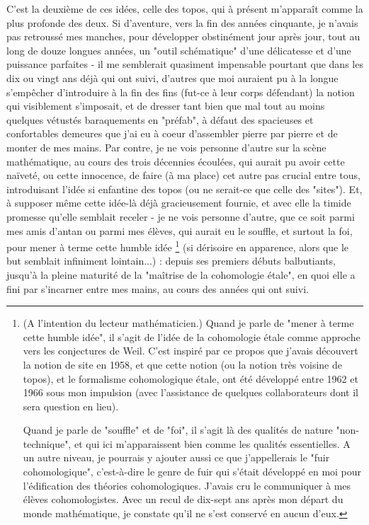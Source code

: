 C'est la deuxième de ces idées, celle des topos, qui à présent m'apparaît comme la plus profonde des deux. Si d'aventure, vers la fin des années cinquante, je n'avais pas retroussé mes manches, pour développer obstinément jour après jour, tout au long de douze longues années, un "outil schématique" d'une délicatesse et d'une puissance parfaites - il me semblerait quasiment impensable pourtant que dans les dix ou vingt ans déjà qui ont suivi, d'autres que moi auraient pu à la longue s'empêcher d'introduire à la fin des fins (fut-ce à leur corps défendant) la notion qui visiblement s'imposait, et de dresser tant bien que mal tout au moins quelques vétustés baraquements en "préfab", à défaut des spacieuses et confortables demeures que j’ai eu à coeur d'assembler pierre par pierre et de monter de mes mains. Par contre, je ne vois personne d'autre sur la scène mathématique, au cours des trois décennies écoulées, qui aurait pu avoir cette naïveté, ou cette innocence, de faire (à ma place) cet autre pas crucial entre tous, introduisant l'idée si enfantine des topos (ou ne serait-ce que celle des "sites"). Et, à supposer même cette idée-là déjà gracieusement fournie, et avec elle la timide promesse qu'elle semblait receler - je ne vois personne d'autre, que ce soit parmi mes amis d'antan ou parmi mes élèves, qui aurait eu le souffle, et surtout la foi, pour mener à terme cette humble idée \footnote{(A l’intention du lecteur mathématicien.) Quand je parle de "mener à terme cette humble idée", il s'agit de l'idée de la cohomologie étale comme approche vers les conjectures de Weil. C'est inspiré par ce propos que j'avais découvert la notion de site en 1958, et que cette notion (ou la notion très voisine de topos), et le formalisme cohomologique étale, ont été développé entre 1962 et 1966 sous mon impulsion (avec l'assistance de quelques collaborateurs dont il sera question en lieu).

Quand je parle de "souffle" et de "foi", il s'agit là des qualités de nature "non-technique", et qui ici m'apparaissent bien comme les qualités essentielles. A un autre niveau, je pourrais y ajouter aussi ce que j'appellerais le "fuir cohomologique", c'est-à-dire le genre de fuir qui s'était développé en moi pour l'édification des théories cohomologiques. J'avais cru le communiquer à mes élèves cohomologistes. Avec un recul de dix-sept ans après mon départ du monde mathématique, je constate qu'il ne s'est conservé en aucun d'eux.} (si dérisoire en apparence, alors que le but semblait infiniment lointain...) : depuis ses premiers débuts balbutiants, jusqu'à la pleine maturité de la "maîtrise de la cohomologie étale", en quoi elle a fini par s'incarner entre mes mains, au cours des années qui ont suivi.




